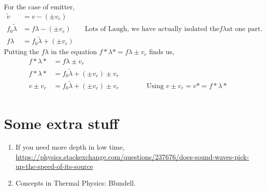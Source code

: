 \documentclass[a4paper]{article}
\begin{document}
For the case of emitter, 
\begin{align}
    \tilde{v}& = v - (\pm v_e)  \\
    f_0 \tilde{\lambda} &= f \lambda - (\pm v_e) \qquad \text{Lots of Laugh, we have actually isolated the} f \lambda \text{at one part.} \\
    f \lambda &= f_0 \tilde{\lambda} + (\pm v_e) 
\end{align} 
Putting the $f \lambda$ in the equation $  f* \lambda*  = f \lambda \pm v_r$ finds us, 
\begin{align}
    f* \lambda* & = f \lambda \pm v_r \\
    f* \lambda* & =  f_0 \tilde{\lambda} + (\pm v_e) \pm v_r \\
    v \pm v_r &=  f_0 \tilde{\lambda} + (\pm v_e) \pm v_r \qquad \qquad \text{Using } v \pm v_r = v* = f* \lambda* \\
    \end{align}  























































\section{Some extra stuff}
\begin{enumerate}
    \item If you need more depth in low time, \url{https://physics.stackexchange.com/questions/237676/does-sound-waves-pick-up-the-speed-of-its-source}
    \item Concepts in Thermal Physics: Blundell.
\end{enumerate}
\end{document}

